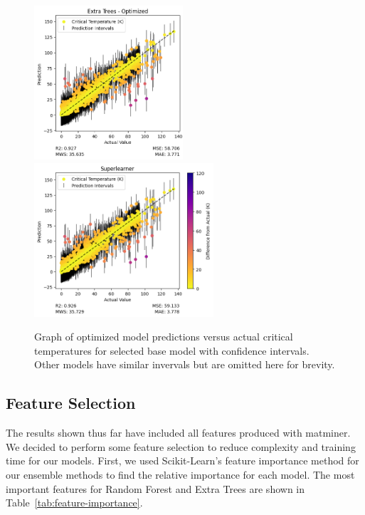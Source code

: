 \documentclass[twocolumn, nofootinbib, secnumarabic, amssymb, nobibnotes, aps, prd]{revtex4-2}
\begin{document}
\begin{figure}[!h]
    \includegraphics[height=2.25in]{images/subfigures/uncertainty/extra_trees_optimized.png}
    \includegraphics[height=2.25in]{images/subfigures/uncertainty/superlearner.png}
    \caption{Graph of optimized model predictions versus actual critical temperatures for selected base model with confidence intervals. Other models have similar invervals but are omitted here for brevity.}
    \label{fig:results-uncertainty}
\end{figure}%

\clearpage

\subsection{Feature Selection} %


The results shown thus far have included all features produced with matminer. We decided to perform some feature selection to reduce complexity and training time for our models. First, we used Scikit-Learn's feature importance method for our ensemble methods to find the relative importance for each model. The most important features for Random Forest and Extra Trees are shown in Table~\ref{tab:feature-importance}. 
\end{document}
